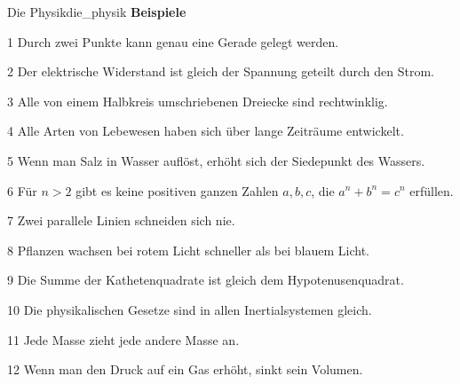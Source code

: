 \documentclass[ngerman]{scrreprt}
\begin{document}
\begin{aufgabebox}{Die Physik}{die_physik}
\bigskip\noindent\textbf{Beispiele}\par\medskip
\begin{tcbraster}[raster columns=2, raster equal height=rows]
    \begin{examplebox}{1}
        Durch zwei Punkte kann genau eine Gerade gelegt werden.
    \end{examplebox}
    \begin{examplebox}{2}
        Der elektrische Widerstand ist gleich der Spannung geteilt durch den Strom.
    \end{examplebox}
    \begin{examplebox}{3}
        Alle von einem Halbkreis umschriebenen Dreiecke sind rechtwinklig.
    \end{examplebox}
    \begin{examplebox}{4}
        Alle Arten von Lebewesen haben sich über lange Zeiträume entwickelt.
    \end{examplebox}
    \begin{examplebox}{5}
        Wenn man Salz in Wasser auflöst, erhöht sich der Siedepunkt des Wassers.
    \end{examplebox}
    \begin{examplebox}{6}
        Für $n>2$ gibt es keine positiven ganzen Zahlen $a, b, c$, die $a^n + b^n = c^n$ erfüllen.
    \end{examplebox}
    \begin{examplebox}{7}
        Zwei parallele Linien schneiden sich nie.
    \end{examplebox}
    \begin{examplebox}{8}
        Pflanzen wachsen bei rotem Licht schneller als bei blauem Licht.
    \end{examplebox}
    \begin{examplebox}{9}
        Die Summe der Kathetenquadrate ist gleich dem Hypotenusenquadrat.
    \end{examplebox}
    \begin{examplebox}{10}
        Die physikalischen Gesetze sind in allen Inertialsystemen gleich.
    \end{examplebox}
    \begin{examplebox}{11}
        Jede Masse zieht jede andere Masse an.
    \end{examplebox}
    \begin{examplebox}{12}
        Wenn man den Druck auf ein Gas erhöht, sinkt sein Volumen.
    \end{examplebox}
\end{tcbraster}
\end{aufgabebox}
\end{document}
